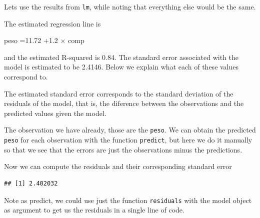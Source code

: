 \documentclass[
]{book}
\newenvironment{Shaded}{\begin{snugshade}}{\end{snugshade}}
\newcommand{\CommentTok}[1]{\textcolor[rgb]{0.56,0.35,0.01}{\textit{#1}}}
\newcommand{\DecValTok}[1]{\textcolor[rgb]{0.00,0.00,0.81}{#1}}
\newcommand{\KeywordTok}[1]{\textcolor[rgb]{0.13,0.29,0.53}{\textbf{#1}}}
\newcommand{\NormalTok}[1]{#1}
\newcommand{\OperatorTok}[1]{\textcolor[rgb]{0.81,0.36,0.00}{\textbf{#1}}}
\begin{document}
Lets use the results from \texttt{lm}, while noting that everything else would be the same.

The estimated regression line is

peso =11.72 +1.2 \(\times\) comp

and the estimated R-squared is 0.84. The standard error associated with the model is estimated to be 2.4146. Below we explain what each of these values correspond to.

The estimated standard error corresponds to the standard deviation of the residuals of the model, that is, the diference between the observations and the predicted values given the model.

The observation we have already, those are the \texttt{peso}. We can obtain the predicted \texttt{peso} for each observation with the function \texttt{predict}, but here we do it manually so that we see that the errors are just the observations minus the predictions.

\begin{Shaded}
\end{Shaded}

Now we can compute the residuals and their corresponding standard error

\begin{Shaded}
\end{Shaded}

\begin{verbatim}
## [1] 2.402032
\end{verbatim}

Note as predict, we could use just the function \texttt{residuals} with the model object as argument to get us the residuals in a single line of code.
\end{document}

